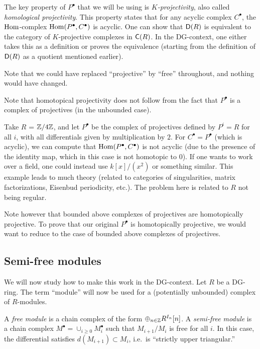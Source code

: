 \documentclass{amsart}
\begin{document}
The key property of $P^\bullet$ that we will be using is \emph{$K$-projectivity}, also called \emph{homological projectivity}.
This property states that for any acyclic complex $C^\bullet$, the $\operatorname{Hom}$-complex $\operatorname{Hom}(P^\bullet, C^\bullet)$ is acyclic.
One can show that $\mathsf{D}(R)$ is equivalent to the category of $K$-projective complexes in $\mathsf{C}(R)$.
In the DG-context, one either takes this as a definition or proves the equivalence (starting from the definition of $\mathsf{D}(R)$ as a quotient mentioned earlier).

\begin{rmk}
	Note that we could have replaced ``projective'' by ``free'' throughout, and nothing would have changed.
\end{rmk}

Note that homotopical projectivity does not follow from the fact that $P^\bullet$ is a complex of projectives (in the unbounded case).

\begin{ex}
	Take $R$ = $\mathbb{Z} / 4 \mathbb{Z}$, and let $P^\bullet$ be the complex of projectives defined by $P^i = R$ for all $i$, with all differentials given by multiplication by $2$.
	For $C^\bullet = P^\bullet$ (which is acyclic), we can compute that $\operatorname{Hom}(P^\bullet, C^\bullet)$ is not acyclic (due to the presence of the identity map, which in this case is not homotopic to $0$).
	If one wants to work over a field, one could instead use $k[x] / (x^2)$ or something similar.
	This example leads to much theory (related to categories of singularities, matrix factorizations, Eisenbud periodicity, etc.).
	The problem here is related to $R$ not being regular.
\end{ex}

Note however that bounded above complexes of projectives are homotopically projective.
To prove that our original $P^\bullet$ is homotopically projective, we would want to reduce to the case of bounded above complexes of projectives.

\subsection{Semi-free modules}

We will now study how to make this work in the DG-context.
Let $R$ be a DG-ring.
The term ``module'' will now be used for a (potentially unbounded) complex of $R$-modules. 

\begin{dfn}
	A \emph{free module} is a chain complex of the form $\oplus_{n \in \mathbb{Z}} R^{I_n}[n]$.
	A \emph{semi-free module} is a chain complex $M^\bullet = \cup_{i \geq 0} M_i^\bullet$ such that $M_{i+1} / M_i$ is free for all $i$.
	In this case, the differential satisfies $d(M_{i+1}) \subset M_i$, i.e.\ is ``strictly upper triangular.''
\end{dfn}
\end{document}
